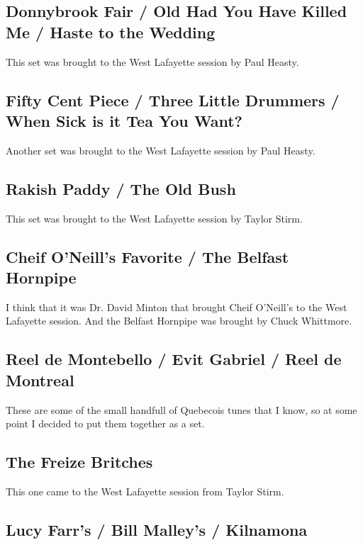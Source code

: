 \documentclass[11pt,letterpaper]{article}
\begin{document}
\subsection*{Donnybrook Fair / Old Had You Have Killed Me / Haste to the Wedding} 

This set was brought to the West Lafayette session by Paul Heasty.

\subsection*{Fifty Cent Piece / Three Little Drummers / When Sick is it Tea You Want?} 

Another set was brought to the West Lafayette session by Paul Heasty.

\subsection*{Rakish Paddy / The Old Bush} 

This set was brought to the West Lafayette session by Taylor Stirm.

\subsection*{Cheif O'Neill's Favorite / The Belfast Hornpipe} 

I think that it was Dr. David Minton that brought Cheif O'Neill's to the West Lafayette session. And the Belfast Hornpipe was brought by Chuck Whittmore.

\subsection*{Reel de Montebello / Evit Gabriel / Reel de Montreal}

These are some of the small handfull of Quebecois tunes that I know, so at some point I decided to put them together as a set. 

\subsection*{The Freize Britches}

This one came to the West Lafayette session from Taylor Stirm.

\subsection*{Lucy Farr's / Bill Malley's / Kilnamona}
\end{document}
